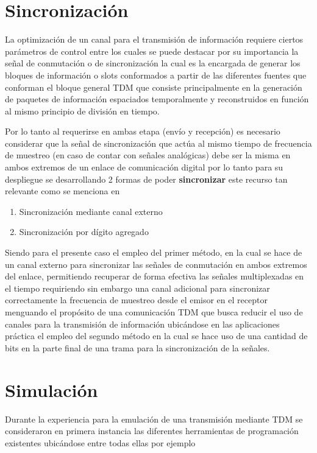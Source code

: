 \documentclass[conference]{IEEEtran}
\begin{document}
	\section{Sincronización}
	
	La optimización de un canal para el transmisión de información requiere ciertos parámetros de control entre los cuales se puede destacar por su importancia la señal de conmutación o de sincronización la cual es la encargada de generar los bloques de información o slots conformados a partir de las diferentes fuentes que conforman el bloque general TDM que consiste principalmente en la generación de paquetes de información espaciados temporalmente y reconstruidos en función al mismo principio de división en tiempo.
	
	Por lo tanto al requerirse en ambas etapa (envío y recepción) es necesario considerar que la señal de sincronización que actúa al mismo tiempo de frecuencia de muestreo (en caso de contar con señales analógicas) debe ser la misma en ambos extremos de un enlace de comunicación digital por lo tanto para su despliegue se desarrollando 2 formas de poder \textbf{sincronizar} este recurso tan relevante como se menciona en \cite{couch2012sistemas}
	
	\begin{enumerate}
		\item Sincronización mediante canal externo
		\item Sincronización por dígito agregado
	\end{enumerate}
	
	Siendo para el presente caso el empleo del primer método, en la cual se hace de un canal externo para sincronizar las señales de conmutación en ambos extremos del enlace, permitiendo recuperar de forma efectiva las señales multiplexadas en el tiempo requiriendo sin embargo una canal adicional para sincronizar correctamente la frecuencia de muestreo desde el emisor en el receptor menguando el propósito de una comunicación TDM que busca reducir el uso de canales para la transmisión de información ubicándose en las aplicaciones práctica el empleo del segundo método en la cual se hace uso de una cantidad de bits en la parte final de una trama para la sincronización de la señales.
	
	\section{Simulación}
	Durante la experiencia para la emulación de una transmisión mediante TDM se consideraron en primera instancia las diferentes herramientas de programación existentes ubicándose entre todas ellas por ejemplo 
	
\end{document}
